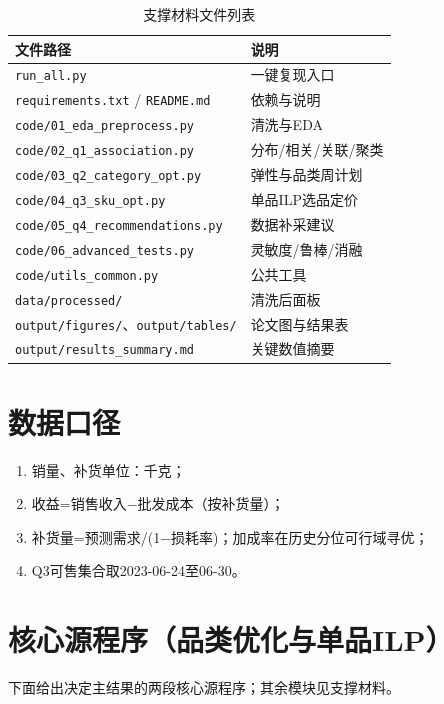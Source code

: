 \documentclass[UTF8,a4paper,12pt]{ctexart}
\begin{document}
\begin{table}[H]
\centering
\caption{支撑材料文件列表}
\scriptsize
\begin{tabular}{p{6.2cm}p{7.5cm}}
\toprule
文件路径 & 说明 \\
\midrule
\texttt{run\_all.py} & 一键复现入口 \\
\texttt{requirements.txt} / \texttt{README.md} & 依赖与说明 \\
\texttt{code/01\_eda\_preprocess.py} & 清洗与EDA \\
\texttt{code/02\_q1\_association.py} & 分布/相关/关联/聚类 \\
\texttt{code/03\_q2\_category\_opt.py} & 弹性与品类周计划 \\
\texttt{code/04\_q3\_sku\_opt.py} & 单品ILP选品定价 \\
\texttt{code/05\_q4\_recommendations.py} & 数据补采建议 \\
\texttt{code/06\_advanced\_tests.py} & 灵敏度/鲁棒/消融 \\
\texttt{code/utils\_common.py} & 公共工具 \\
\texttt{data/processed/} & 清洗后面板 \\
\texttt{output/figures/}、\texttt{output/tables/} & 论文图与结果表 \\
\texttt{output/results\_summary.md} & 关键数值摘要 \\
\bottomrule
\end{tabular}
\end{table}

\section{数据口径}
\begin{enumerate}[leftmargin=2em]
\item 销量、补货单位：千克；
\item 收益=销售收入$-$批发成本（按补货量）；
\item 补货量=预测需求/(1$-$损耗率)；加成率在历史分位可行域寻优；
\item Q3可售集合取2023-06-24至06-30。
\end{enumerate}

\section{核心源程序（品类优化与单品ILP）}
下面给出决定主结果的两段核心源程序；其余模块见支撑材料。




\end{document}
